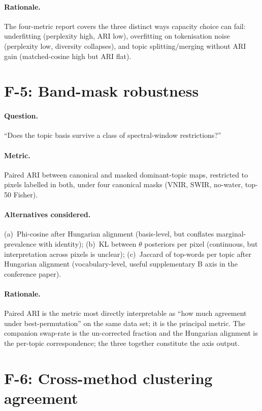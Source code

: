 \documentclass[11pt,a4paper]{article}
\begin{document}
\paragraph{Rationale.} The four-metric report covers the three
distinct ways capacity choice can fail: underfitting (perplexity
high, ARI low), overfitting on tokenisation noise (perplexity low,
diversity collapses), and topic splitting/merging without ARI gain
(matched-cosine high but ARI flat).

\section{F-5: Band-mask robustness}

\paragraph{Question.} ``Does the topic basis survive a class of
spectral-window restrictions?''

\paragraph{Metric.} Paired ARI between canonical and masked
dominant-topic maps, restricted to pixels labelled in both, under
four canonical masks (VNIR, SWIR, no-water, top-50 Fisher).

\paragraph{Alternatives considered.} (a)~Phi-cosine after Hungarian
alignment (basis-level, but conflates marginal-prevalence with
identity); (b)~KL between $\theta$ posteriors per pixel
(continuous, but interpretation across pixels is unclear);
(c)~Jaccard of top-words per topic after Hungarian alignment
(vocabulary-level, useful supplementary B axis in the conference
paper).

\paragraph{Rationale.} Paired ARI is the metric most directly
interpretable as ``how much agreement under best-permutation'' on
the same data set; it is the principal metric. The companion
swap-rate is the un-corrected fraction and the Hungarian alignment
is the per-topic correspondence; the three together constitute the
axis output.

\section{F-6: Cross-method clustering agreement}
\end{document}
